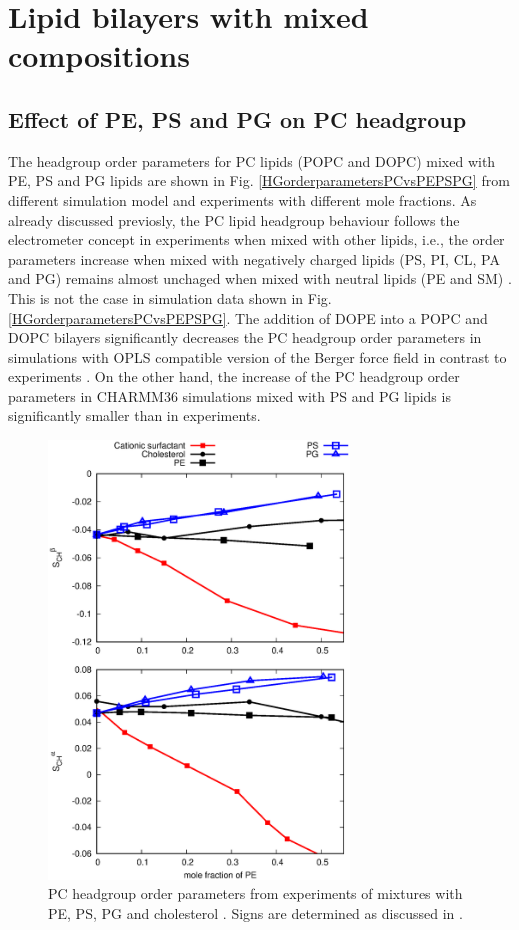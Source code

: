 \documentclass[aps,prl,superscriptaddress,twocolumn]{revtex4}
\begin{document}
\section{Lipid bilayers with mixed compositions}

\subsection{Effect of PE, PS and PG on PC headgroup}
The headgroup order parameters for PC lipids (POPC and DOPC)
mixed with PE, PS and PG lipids are shown in Fig. \ref{HGorderparametersPCvsPEPSPG}
from different simulation model and experiments \cite{scherer87} with different
mole fractions. As already discussed previosly, the PC lipid headgroup behaviour
follows the electrometer concept in experiments when mixed with other lipids, i.e., the order
parameters increase when mixed with negatively charged lipids (PS, PI, CL, PA and PG)
remains almost unchaged when mixed with neutral lipids (PE and SM) \cite{scherer87}.
This is not the case in simulation data shown in Fig. \ref{HGorderparametersPCvsPEPSPG}.
The addition of DOPE into a POPC and DOPC bilayers significantly decreases the PC headgroup
order parameters in simulations with OPLS compatible version of the Berger force field \cite{tieleman06}
in contrast to experiments \cite{scherer87}. On the other hand, the increase of the PC
headgroup order parameters in CHARMM36 simulations mixed with PS and PG lipids is significantly
smaller than in experiments.
\begin{figure}[]
  \centering
  \includegraphics[width=8.0cm]{../Figs/HGorderparametersPCvsPEPSPGchol.eps}
  \caption{\label{HGorderparametersPCvsPEPSPGchol}
    PC headgroup order parameters from experiments of mixtures with
    PE, PS, PG and cholesterol \cite{scherer87,scherer89,ferreira13}.
    Signs are determined as discussed in \cite{botan15,ollila16}.
  }
\end{figure}
\end{document}
